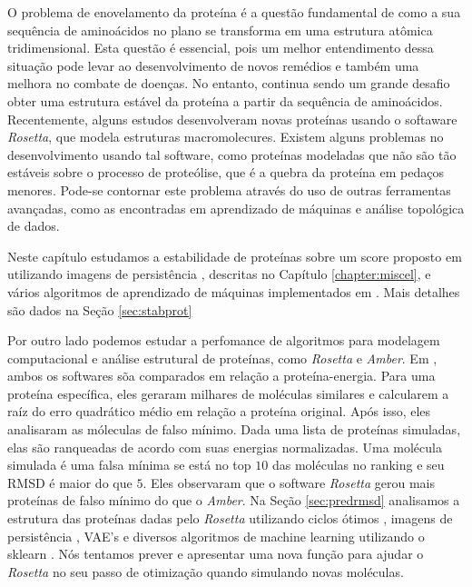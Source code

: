 O problema de enovelamento da proteína é a questão fundamental de como a sua sequência de aminoácidos
no plano se transforma em uma estrutura atômica tridimensional. Esta questão é essencial, pois
um melhor entendimento dessa situação pode levar ao desenvolvimento de novos remédios e também
uma melhora no combate de doenças. No entanto, continua sendo um grande desafio obter
uma estrutura estável da proteína a partir da sequência de aminoácidos.
Recentemente, alguns estudos \cite{Rocklin2017} desenvolveram novas proteínas usando o softaware
\textit{Rosetta}, que modela estruturas macromolecures. Existem alguns problemas no
desenvolvimento usando tal software, como proteínas modeladas que não são tão
estáveis sobre o processo de proteólise, que é a quebra da proteína em pedaços
menores. Pode-se contornar este problema através do uso de outras ferramentas avançadas, como
as encontradas em aprendizado de máquinas e análise topológica de dados.

Neste capítulo estudamos a estabilidade de proteínas sobre um score proposto
em \cite{Rocklin2017} utilizando imagens de persistência \cite{Adams2017}, descritas
no Capítulo \ref{chapter:miscel}, e vários algoritmos de aprendizado de máquinas
implementados em \cite{scikit-learn}. Mais detalhes são dados na Seção \ref{sec:stabprot}

Por outro lado podemos estudar a perfomance de algoritmos para modelagem computacional e
análise estrutural de proteínas, como \textit{Rosetta} e \textit{Amber}.
Em \cite{Rubenstein2018}, ambos os softwares sõa comparados em relação a proteína-energia.
Para uma proteína específica, eles geraram milhares de moléculas similares e calcularem
a raíz do erro quadrático médio em relação a proteína original.
Após isso, eles analisaram as móleculas de falso mínimo. Dada uma lista de proteínas
simuladas, elas são ranqueadas de acordo com suas energias normalizadas. Uma molécula
simulada é uma falsa mínima se está no top $10$ das moléculas no ranking e seu
RMSD é maior do que $5$. Eles observaram que o software \textit{Rosetta} gerou mais
proteínas de falso mínimo do que o \textit{Amber}. Na Seção \ref{sec:predrmsd}
analisamos a estrutura das proteínas dadas pelo \textit{Rosetta} utilizando ciclos ótimos
\cite{Escolar2015}, imagens de persistência \cite{Adams2017}, VAE's \cite{kingma2013} e
diversos algoritmos de machine learning utilizando o sklearn \cite{scikit-learn}. Nós
tentamos prever e apresentar uma nova função para ajudar o \textit{Rosetta} no seu
passo de otimização quando simulando novas moléculas.

